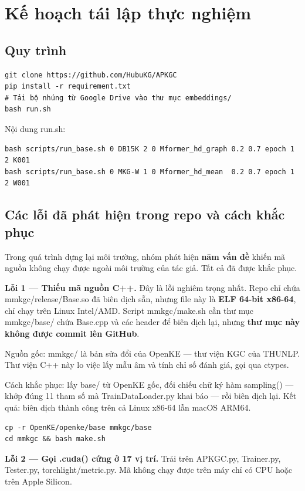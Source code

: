 \documentclass[11pt,a4paper]{article}
\newcommand{\code}[1]{{\ttfamily\small\color{codetext}#1}}
\begin{document}
\section{Kế hoạch tái lập thực nghiệm}
\subsection{Quy trình}
\begin{lstlisting}
git clone https://github.com/HubuKG/APKGC
pip install -r requirement.txt
# Tải bộ nhúng từ Google Drive vào thư mục embeddings/
bash run.sh
\end{lstlisting}
Nội dung \code{run.sh}:

\begin{lstlisting}
bash scripts/run_base.sh 0 DB15K 2 0 Mformer_hd_graph 0.2 0.7 epoch 1 2 K001
bash scripts/run_base.sh 0 MKG-W 1 0 Mformer_hd_mean  0.2 0.7 epoch 1 2 W001
\end{lstlisting}
\subsection{Các lỗi đã phát hiện trong repo và cách khắc phục}
Trong quá trình dựng lại môi trường, nhóm phát hiện \textbf{năm vấn đề} khiến mã nguồn không chạy được ngoài môi trường của tác giả. Tất cả đã được khắc phục.

\textbf{Lỗi 1 --- Thiếu mã nguồn C++.} Đây là lỗi nghiêm trọng nhất. Repo chỉ chứa \code{mmkgc/release/Base.so} đã biên dịch sẵn, nhưng file này là \textbf{ELF 64-bit x86-64}, chỉ chạy trên Linux Intel/AMD. Script \code{mmkgc/make.sh} cần thư mục \code{mmkgc/base/} chứa \code{Base.cpp} và các header để biên dịch lại, nhưng \textbf{thư mục này không được commit lên GitHub}.

Nguồn gốc: \code{mmkgc/} là bản sửa đổi của OpenKE --- thư viện KGC của THUNLP. Thư viện C++ này lo việc lấy mẫu âm và tính chỉ số đánh giá, gọi qua \code{ctypes}.

Cách khắc phục: lấy \code{base/} từ OpenKE gốc, đối chiếu chữ ký hàm \code{sampling()} --- khớp đúng 11 tham số mà \code{TrainDataLoader.py} khai báo --- rồi biên dịch lại. Kết quả: biên dịch thành công trên cả Linux x86-64 lẫn macOS ARM64.

\begin{lstlisting}
cp -r OpenKE/openke/base mmkgc/base
cd mmkgc && bash make.sh
\end{lstlisting}
\textbf{Lỗi 2 --- Gọi \code{.cuda()} cứng ở 17 vị trí.} Trải trên \code{APKGC.py}, \code{Trainer.py}, \code{Tester.py}, \code{torchlight/metric.py}. Mã không chạy được trên máy chỉ có CPU hoặc trên Apple Silicon.
\end{document}
